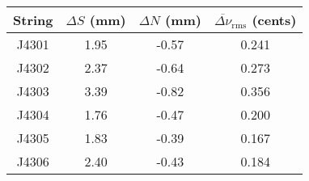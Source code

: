 \begin{tabular}{cccc}
\toprule
String & $\Delta S$ (mm) & $\Delta N$ (mm) & $\overline{\Delta \nu}_\text{rms}$ (cents) \\
\midrule
J4301 & 1.95 & -0.57 & 0.241 \\
J4302 & 2.37 & -0.64 & 0.273 \\
J4303 & 3.39 & -0.82 & 0.356 \\
J4304 & 1.76 & -0.47 & 0.200 \\
J4305 & 1.83 & -0.39 & 0.167 \\
J4306 & 2.40 & -0.43 & 0.184 \\
\bottomrule
\end{tabular}

